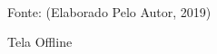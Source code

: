 \begin{figure}[!htpb]
	\centering
	\caption{Tela Offline}
	\\
	{\footnotesize Fonte: (Elaborado Pelo Autor, 2019)}
	\label{offline}
\end{figure}

